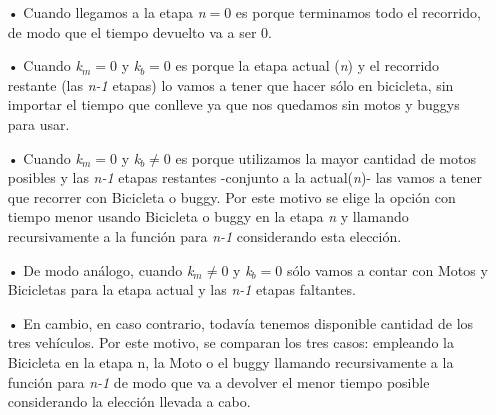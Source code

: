 \begin{itemize}
\item[•]Cuando llegamos a la etapa \emph{n}$=0$ es porque terminamos todo el recorrido, de modo que el tiempo devuelto va a ser 0.

\item[•]Cuando \emph{k$_m$}$=0$ y \emph{k$_b$}$=0$ es porque la etapa actual (\emph{n}) y el recorrido restante (las \emph{n-1} etapas) lo vamos a tener que hacer s\'olo en bicicleta, sin importar el tiempo que conlleve ya que nos quedamos sin motos y buggys para usar.

\item[•]Cuando \emph{k$_m$}$=0$ y \emph{k$_b$}$\neq0$ es porque utilizamos la mayor cantidad de motos posibles y las \emph{n-1} etapas restantes -conjunto a la actual(\emph{n})- las vamos a tener que recorrer con Bicicleta o buggy. Por este motivo se elige la opci\'on con tiempo menor usando Bicicleta o buggy en la etapa \emph{n} y llamando recursivamente a la funci\'on para \emph{n-1} considerando esta elecci\'on.

\item[•]De modo an\'alogo, cuando \emph{k$_m$}$\neq0$ y \emph{k$_b$}$=0$ s\'olo vamos a contar con Motos y Bicicletas para la etapa actual y las \emph{n-1} etapas faltantes.

\item[•]En cambio, en caso contrario, todav\'ia tenemos disponible cantidad de los tres veh\'iculos. Por este motivo, se comparan los tres casos: empleando la Bicicleta en la etapa n, la Moto o el buggy llamando recursivamente a la funci\'on para \emph{n-1} de modo que va a devolver el menor tiempo posible considerando la elecci\'on llevada a cabo.
\end{itemize}



